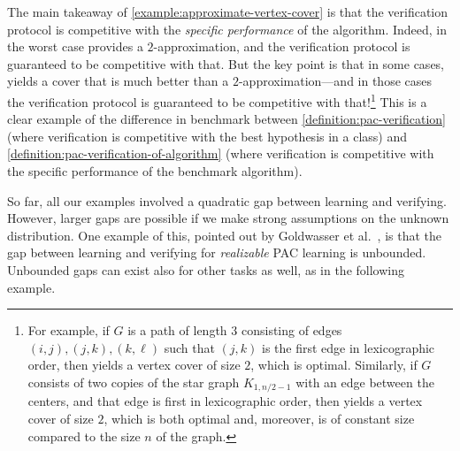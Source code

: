 The main takeaway of \cref{example:approximate-vertex-cover} is that the verification protocol is competitive with the \emph{specific performance} of the algorithm. Indeed, in the worst case  provides a {$2$-approximation}, and the verification protocol is guaranteed to be competitive with that. But the key point is that in some cases,  yields a cover that is much better than a {$2$-approximation}---and in those cases the verification protocol is guaranteed to be competitive with that!\footnote{%
	For example, if $G$ is a path of length $3$ consisting of edges $(i,j), (j,k), (k,\ell)$ such that $(j,k)$ is the first edge in lexicographic order, then  yields a vertex cover of size $2$, which is optimal. Similarly, if $G$ consists of two copies of the star graph $K_{1,n/2-1}$ with an edge between the centers, and that edge is first in lexicographic order, then  yields a vertex cover of size $2$, which is both optimal and, moreover, is of constant size compared to the size $n$ of the graph.%
} This is a clear example of the difference in benchmark between \cref{definition:pac-verification} (where verification is competitive with the best hypothesis in a class) and \cref{definition:pac-verification-of-algorithm} (where verification is competitive with the specific performance of the benchmark algorithm).

So far, all our examples involved a quadratic gap between learning and verifying. However, larger gaps are possible if we make strong assumptions on the unknown distribution. One example of this, pointed out by Goldwasser et al.\ \cite{GoldwasserRSY21}, is that the gap between learning and verifying for \emph{realizable} PAC learning is unbounded. Unbounded gaps can exist also for other tasks as well, as in the following example.

